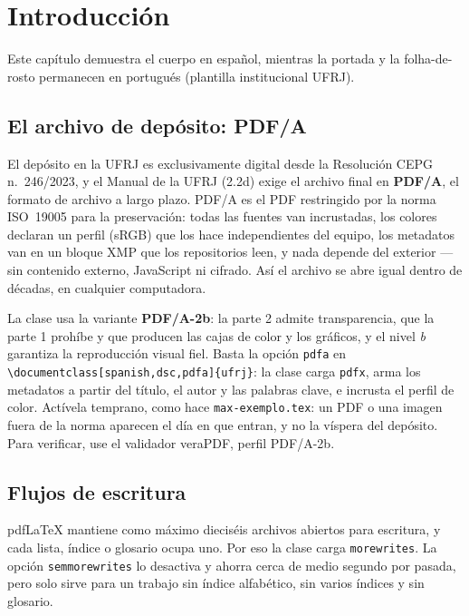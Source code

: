 \documentclass[spanish,dsc]{ufrj}
\begin{document}
  \chapter{Introducción}
  Este capítulo demuestra el cuerpo en español, mientras la portada
  y la folha-de-rosto permanecen en portugués (plantilla institucional
  UFRJ).
  \section{El archivo de depósito: PDF/A}
  El depósito en la UFRJ es exclusivamente digital desde la Resolución CEPG
  n.~246/2023, y el Manual de la UFRJ (2.2d) exige el archivo final en
  \textbf{PDF/A}, el formato de archivo a largo plazo. PDF/A es el PDF
  restringido por la norma ISO~19005 para la preservación: todas las fuentes van
  incrustadas, los colores declaran un perfil (sRGB) que los hace independientes
  del equipo, los metadatos van en un bloque XMP que los repositorios leen, y
  nada depende del exterior --- sin contenido externo, JavaScript ni cifrado.
  Así el archivo se abre igual dentro de décadas, en cualquier computadora.

  La clase usa la variante \textbf{PDF/A-2b}: la parte 2 admite transparencia,
  que la parte 1 prohíbe y que producen las cajas de color y los gráficos, y el
  nivel \emph{b} garantiza la reproducción visual fiel. Basta la opción
  \texttt{pdfa} en \verb|\documentclass[spanish,dsc,pdfa]{ufrj}|: la clase carga
  \texttt{pdfx}, arma los metadatos a partir del título, el autor y las palabras
  clave, e incrusta el perfil de color. Actívela temprano, como hace
  \texttt{max-exemplo.tex}: un PDF o una imagen fuera de la norma aparecen el día en
  que entran, y no la víspera del depósito. Para verificar, use el validador
  veraPDF, perfil PDF/A-2b.

  \section{Flujos de escritura}
  pdf\LaTeX{} mantiene como máximo dieciséis archivos abiertos para escritura,
  y cada lista, índice o glosario ocupa uno. Por eso la clase carga
  \texttt{morewrites}. La opción \texttt{semmorewrites} lo desactiva y ahorra
  cerca de medio segundo por pasada, pero solo sirve para un trabajo sin índice
  alfabético, sin varios índices y sin glosario.
\end{document}
